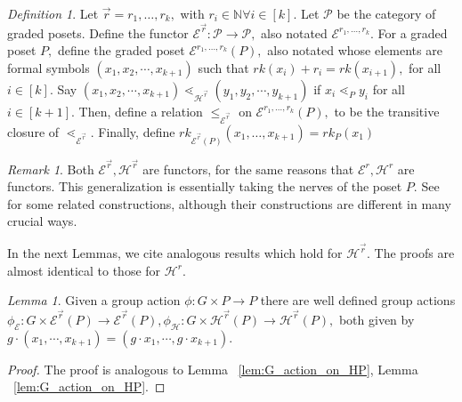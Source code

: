 \documentclass[10 pt]{amsart}
\theoremstyle{plain}
\theoremstyle{definition}
\theoremstyle{remark}
\numberwithin{equation}{section}
\newtheorem{lem}[thm]{Lemma}
\theoremstyle{remark}
\newtheorem{rem}[thm]{Remark}
\newtheorem{defn}[thm]{Definition}
\newcommand\BN{{\mathbb N}}
\renewcommand{\vec}[1]{\overrightarrow{#1}}
\begin{document}
\begin{defn}
Let $\vec r = r_1,\ldots,r_k,$ with $r_i \in \BN\forall i \in [k].$ Let $\mathcal P$ be the category of graded posets. Define the functor $\mathcal E^{\vec r}:\mathcal P \rightarrow \mathcal P,$ also notated $\mathcal E^{r_1,\ldots, r_k}.$ For a graded poset $P,$ define the graded poset $\mathcal E^{r_1,\ldots, r_k}(P),$ also notated whose elements are formal symbols $(x_1, x_2, \cdots, x_{k+1})$ such that $rk(x_i)+r_i = rk(x_{i+1}),$ for all $i \in [k].$ Say 
$(x_1, x_2, \cdots, x_{k+1})\lessdot_{\mathcal H^{\vec r}} (y_1, y_2, \cdots , y_{k+1})$ if $x_i \lessdot_P y_i$ for all $i \in [k+1]$. Then, define a relation $\leq_{\mathcal E^{\vec r}}$ on $\mathcal E^{r_1,\ldots, r_k}(P),$ to be the transitive closure of $\lessdot_{\mathcal E^{\vec r}}.$ Finally, define $rk_{\mathcal E^{\vec r}(P)}(x_1,\ldots, x_{k+1}) = rk_P(x_1)$
\end{defn}

\begin{rem}
Both $\mathcal E^{\vec r},\mathcal H^{\vec r}$ are functors, for the same reasons that $\mathcal E^r, \mathcal H^r$ are functors. This generalization is essentially taking the nerves of the poset $P.$ See \cite{babson} for some related constructions, although their constructions are different in many crucial ways.
\end{rem}

In the next Lemmas, we cite analogous results which hold for $\mathcal H^{\vec r}.$ The proofs are almost identical to those for $\mathcal H^r.$

\begin{lem}
Given a group action $\phi:G \times P \rightarrow P$ there are well defined group actions $\phi_{\mathcal E}:G\times \mathcal E^{\vec r}(P) \rightarrow \mathcal E^{\vec r}(P),\phi_{\mathcal H}:G\times \mathcal H^{\vec r}(P) \rightarrow \mathcal H^{\vec r}(P),$ 
both given by $g \cdot (x_1, \cdots, x_{k+1}) =(g\cdot x_1, \cdots, g \cdot x_{k+1}).$
\end{lem}
\begin{proof}
The proof is analogous to Lemma ~\ref{lem:G_action_on_HP}, Lemma ~\ref{lem:G_action_on_HP}.
\end{proof}
\end{document}
